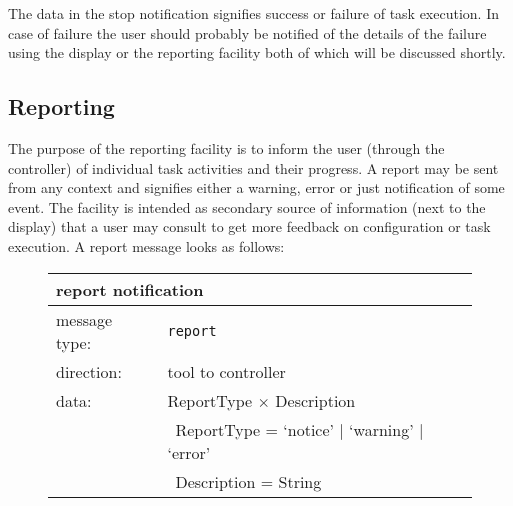 \documentclass{article}
\newcommand{\msg}[1]{\texttt{#1}}
\begin{document}
   \noindent The data in the stop notification signifies success or failure
   of task execution. In case of failure the user should probably be notified
   of the details of the failure using the display or the reporting facility
   both of which will be discussed shortly.
   

  \subsection{Reporting}

   The purpose of the reporting facility is to inform the user (through the
   controller) of individual task activities and their progress. A report may
   be sent from any context and signifies either a warning, error or just
   notification of some event. The facility is intended as secondary source of
   information (next to the display) that a user may consult to get more
   feedback on configuration or task execution. A report message looks as follows:
   
   \begin{figure}[H]
    \begin{center}
     \begin{tabular}{|ll|}
      \hline
       \multicolumn{2}{|l|}{\textbf{report notification}} \\
      \hline
       message type:   & \msg{report} \\
      \hline
       direction:      & tool to controller \\
       data:           & ReportType $\times$ Description \\
                       & \ ReportType = `notice' $|$ `warning' $|$ `error' \\
                       & \ Description = String \\
      \hline
     \end{tabular}
    \end{center}
   \end{figure}
   \vspace{-0.3cm}
\end{document}
